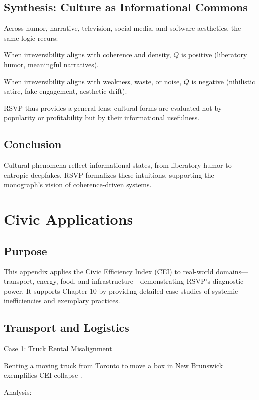 \documentclass{book}
\begin{document}
\section{Synthesis: Culture as Informational Commons}

Across humor, narrative, television, social media, and software aesthetics, the same logic recurs:

When irreversibility aligns with coherence and density, \( Q \) is positive (liberatory humor, meaningful narratives).

When irreversibility aligns with weakness, waste, or noise, \( Q \) is negative (nihilistic satire, fake engagement, aesthetic drift).

RSVP thus provides a general lens: cultural forms are evaluated not by popularity or profitability but by their informational usefulness.

\section{Conclusion}

Cultural phenomena reflect informational states, from liberatory humor to entropic deepfakes. RSVP formalizes these intuitions, supporting the monograph’s vision of coherence-driven systems.

\chapter{Civic Applications}

\section{Purpose}

This appendix applies the Civic Efficiency Index (CEI) to real-world domains—transport, energy, food, and infrastructure—demonstrating RSVP’s diagnostic power. It supports Chapter 10 by providing detailed case studies of systemic inefficiencies and exemplary practices.

\section{Transport and Logistics}

Case 1: Truck Rental Misalignment

Renting a moving truck from Toronto to move a box in New Brunswick exemplifies CEI collapse \cite{toronto2025}.

Analysis:
\end{document}
